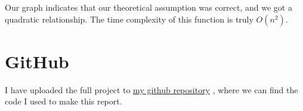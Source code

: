 \documentclass[a4paper,11pt]{article}
\newcommand{\underlinehref}[2]{%
  \href{#1}{\ul{#2}}%
}
\begin{document}
Our graph indicates that our theoretical assumption was correct, and we got a quadratic relationship.
The time complexity of this function is truly $O(n^2)$.

\section*{GitHub}

I have uploaded the full project to \underlinehref{https://github.com/peterherczku/ID1021/tree/main/assignment-1}{my github repository}, where we can find the code I used to make this report.
\end{document}

